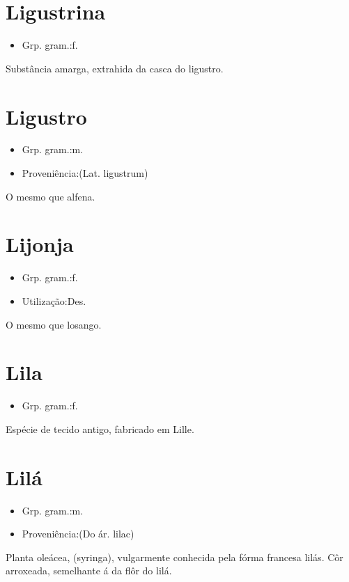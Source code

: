 \section{Ligustrina}
\begin{itemize}
\item {Grp. gram.:f.}
\end{itemize}
Substância amarga, extrahida da casca do ligustro.
\section{Ligustro}
\begin{itemize}
\item {Grp. gram.:m.}
\end{itemize}
\begin{itemize}
\item {Proveniência:(Lat. \textunderscore ligustrum\textunderscore )}
\end{itemize}
O mesmo que \textunderscore alfena\textunderscore .
\section{Lijonja}
\begin{itemize}
\item {Grp. gram.:f.}
\end{itemize}
\begin{itemize}
\item {Utilização:Des.}
\end{itemize}
O mesmo que \textunderscore losango\textunderscore .
\section{Lila}
\begin{itemize}
\item {Grp. gram.:f.}
\end{itemize}
Espécie de tecido antigo, fabricado em Lille.
\section{Lilá}
\begin{itemize}
\item {Grp. gram.:m.}
\end{itemize}
\begin{itemize}
\item {Proveniência:(Do ár. \textunderscore lilac\textunderscore )}
\end{itemize}
Planta oleácea, (\textunderscore syringa\textunderscore ), vulgarmente conhecida pela fórma francesa \textunderscore lilás\textunderscore .
Côr arroxeada, semelhante á da flôr do lilá.
